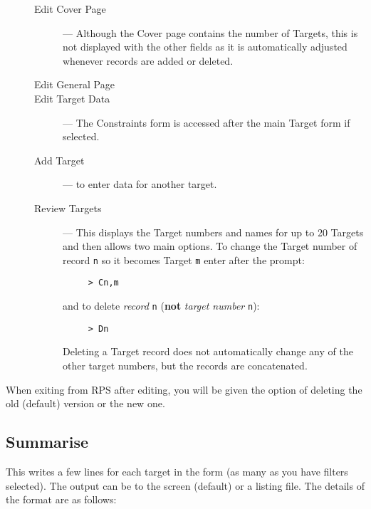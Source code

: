 \begin{description}
\item[\mbox{}]\mbox{}
\begin{description}

\item [Edit Cover Page] --- Although the Cover page contains the number
of Targets, this is not displayed with the other fields as it is
automatically adjusted whenever records are added or deleted.

\item [Edit General Page]

\item [Edit Target Data] --- The Constraints form is accessed after the
main Target form if selected.

\item [Add Target] --- to enter data for another target.

\item [Review Targets] --- This displays the Target numbers and names
for up to 20 Targets and then allows two main options. To change the
Target number of record {\tt n} so it becomes Target {\tt m} enter
after the prompt:

\begin{verbatim}
     > Cn,m
\end{verbatim}

and to delete {\em record} {\tt n} ({\bf not} {\em target number} {\tt n}):

\begin{verbatim}
     > Dn
\end{verbatim}

Deleting a Target record does not automatically change any of the other
target numbers, but the records are concatenated.

\end{description}
\end{description}

When exiting from RPS after editing, you will be given the option of
deleting the old (default) version or the new one.

\subsection{Summarise}

This writes a few lines for each target in the form (as many as you
have filters selected).  The output can be to the screen (default) or a
listing file.  The details of the format are as follows:

